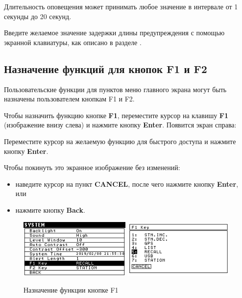 Длительность оповещения может принимать любое значение в интервале от 1 секунды
до 20 секунд.

Введите желаемое значение задержки длины предупреждения с помощью экранной
клавиатуры, как описано в разделе
.

\subsection{Назначение функций для кнопок F1 и F2}

Пользовательские функции для пунктов меню главного экрана могут быть назначены
пользователем кнопкам F1 и F2.

Чтобы назначить функцию кнопке \textbf{F1}, переместите курсор на клавишу
\textbf{F1} (изображение внизу слева) и нажмите кнопку \textbf{Enter}. Появится
экран справа:

Переместите курсор на желаемую функцию для быстрого доступа и нажмите
кнопку \textbf{Enter}.

Чтобы покинуть это экранное изображение без изменений:
\begin{itemize}
  \item наведите курсор на пункт \textbf{CANCEL}, после чего нажмите кнопку
    \textbf{Enter}, или

  \item нажмите кнопку \textbf{Back}.
\end{itemize}

\begin{figure}[H]
  \centering
  \includegraphics[width=0.49\textwidth]{figures/assigning_a_shortcut_to_the_f1_button_1}
  \includegraphics[width=0.49\textwidth]{figures/assigning_a_shortcut_to_the_f1_button_2}
  \caption{Назначение функции кнопке F1}
  \label{fig:assigning_a_shortcut_to_the_f1_button}
\end{figure}

